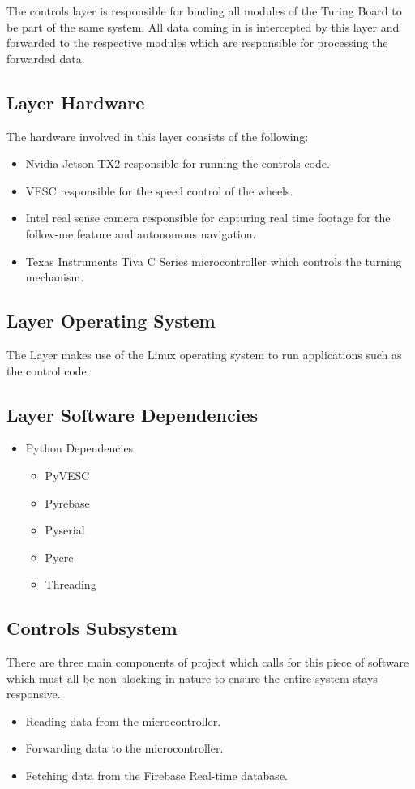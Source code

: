 The controls layer is responsible for binding all modules of the Turing Board to be part of the same system. All data coming in is intercepted by this layer and forwarded to the respective modules which are responsible for processing the forwarded data.

\subsection{Layer Hardware}
The hardware involved in this layer consists of the following:
\begin{itemize}
    \item Nvidia Jetson TX2 responsible for running the controls code.
    \item VESC responsible for the speed control of the wheels.
    \item Intel real sense camera responsible for capturing real time footage for the follow-me feature and autonomous navigation.
    \item Texas Instruments Tiva C Series microcontroller which controls the turning mechanism.
\end{itemize}

\subsection{Layer Operating System}
The Layer makes use of the Linux operating system to run applications such as the control code.

\subsection{Layer Software Dependencies}
\begin{itemize}
    \item Python Dependencies
    \begin{itemize}
        \item PyVESC
        \item Pyrebase
        \item Pyserial
        \item Pycrc
        \item Threading
    \end{itemize}
\end{itemize}

\subsection{Controls Subsystem}
There are three main components of project which calls for this piece of software which must all be non-blocking in nature to ensure the entire system stays responsive.
\begin{itemize}
    \item Reading data from the microcontroller.
    \item Forwarding data to the microcontroller.
    \item Fetching data from the Firebase Real-time database.
\end{itemize}

